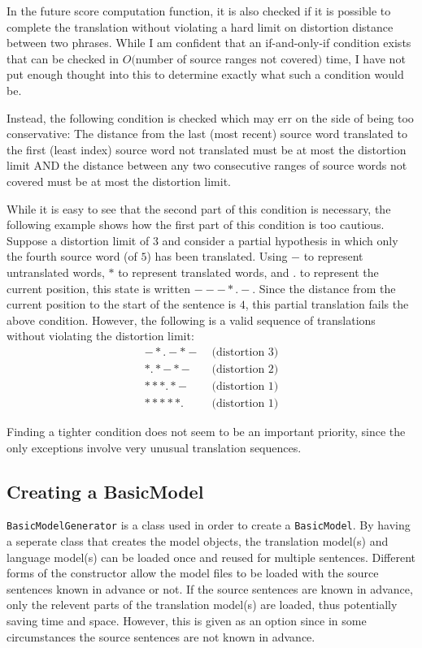 \documentclass[12pt]{amsart} \usepackage{epsfig} \usepackage{rotating}
\newcommand{\code}{\small\texttt}
\begin{document}
In the future score computation function, it is also checked if it is possible
to complete the translation without violating a hard limit on distortion
distance between two phrases.  While I am confident that an if-and-only-if
condition exists that can be checked in $O($number of source ranges not
covered$)$ time, I have not put enough thought into this to determine exactly
what such a condition would be.

Instead, the following condition is checked which may err on the side of being
too conservative: The distance from the last (most recent) source word
translated to the first (least index) source word not translated must be at
most the distortion limit AND the distance between any two consecutive ranges
of source words not covered must be at most the distortion limit.

While it is easy to see that the second part of this condition is necessary,
the following example shows how the first part of this condition is too
cautious.  Suppose a distortion limit of $3$ and consider a partial hypothesis
in which only the fourth source word (of $5$) has been translated.  Using $-$
to represent untranslated words, $*$ to represent translated words, and $.$ to
represent the current position, this state is written $---*.-$.  Since the
distance from the current position to the start of the sentence is $4$, this
partial translation fails the above condition.  However, the following is a
valid sequence of translations without violating the distortion limit:
\begin{align*}
-*.-*- \; &\text{(distortion $3$)} \\ *.*-*- \; &\text{(distortion $2$)} \\
***.*- \; &\text{(distortion $1$)} \\ *****. \; &\text{(distortion $1$)}
\end{align*}

Finding a tighter condition does not seem to be an important priority, since
the only exceptions involve very unusual translation sequences.

\subsection{Creating a BasicModel}
\code{BasicModelGenerator} is a class used in order to create a
\code{BasicModel}.  By having a seperate class that creates the model objects,
the translation model(s) and language model(s) can be loaded once and reused
for multiple sentences.  Different forms of the constructor allow the model
files to be loaded with the source sentences known in advance or not.  If the
source sentences are known in advance, only the relevent parts of the
translation model(s) are loaded, thus potentially saving time and space.
However, this is given as an option since in some circumstances the source
sentences are not known in advance.
\end{document}
